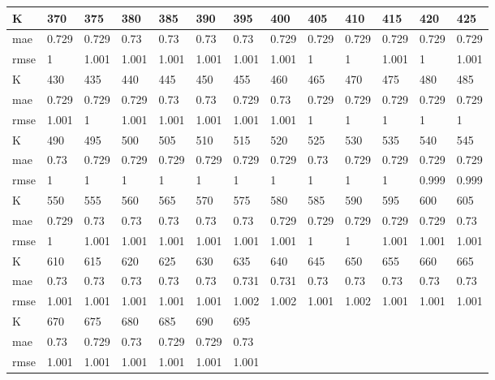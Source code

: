 \begin{appendices}
\begin{center}
\begin{tabularx}{\textwidth}{|l|X|X|X|X|X|X|X|X|X|X|X|X|}
		\hline 
		K & 370 & 375 & 380 & 385 & 390 & 395 & 400 & 405 & 410 & 415 & 420 & 425 \\ \hline 
		mae & 0.729 & 0.729 & 0.73 & 0.73 & 0.73 & 0.73 & 0.729 & 0.729 & 0.729 & 0.729 & 0.729 & 0.729 \\ \hline 
		rmse & 1 & 1.001 & 1.001 & 1.001 & 1.001 & 1.001 & 1.001 & 1 & 1 & 1.001 & 1 & 1.001 \\ \hline 
		\hline 
		K & 430 & 435 & 440 & 445 & 450 & 455 & 460 & 465 & 470 & 475 & 480 & 485 \\ \hline 
		mae & 0.729 & 0.729 & 0.729 & 0.73 & 0.73 & 0.729 & 0.73 & 0.729 & 0.729 & 0.729 & 0.729 & 0.729 \\ \hline 
		rmse & 1.001 & 1 & 1.001 & 1.001 & 1.001 & 1.001 & 1.001 & 1 & 1 & 1 & 1 & 1 \\ \hline 
		\hline 
		K & 490 & 495 & 500 & 505 & 510 & 515 & 520 & 525 & 530 & 535 & 540 & 545 \\ \hline 
		mae & 0.73 & 0.729 & 0.729 & 0.729 & 0.729 & 0.729 & 0.729 & 0.73 & 0.729 & 0.729 & 0.729 & 0.729 \\ \hline 
		rmse & 1 & 1 & 1 & 1 & 1 & 1 & 1 & 1 & 1 & 1 & 0.999 & 0.999 \\ \hline 
		\hline 
		K & 550 & 555 & 560 & 565 & 570 & 575 & 580 & 585 & 590 & 595 & 600 & 605 \\ \hline 
		mae & 0.729 & 0.73 & 0.73 & 0.73 & 0.73 & 0.73 & 0.729 & 0.729 & 0.729 & 0.729 & 0.729 & 0.73 \\ \hline 
		rmse & 1 & 1.001 & 1.001 & 1.001 & 1.001 & 1.001 & 1.001 & 1 & 1 & 1.001 & 1.001 & 1.001 \\ \hline 
		\hline 
		K & 610 & 615 & 620 & 625 & 630 & 635 & 640 & 645 & 650 & 655 & 660 & 665 \\ \hline 
		mae & 0.73 & 0.73 & 0.73 & 0.73 & 0.73 & 0.731 & 0.731 & 0.73 & 0.73 & 0.73 & 0.73 & 0.73 \\ \hline 
		rmse & 1.001 & 1.001 & 1.001 & 1.001 & 1.001 & 1.002 & 1.002 & 1.001 & 1.002 & 1.001 & 1.001 & 1.001 \\ \hline 
		\hline 
		K & 670 & 675 & 680 & 685 & 690 & 695  & & & & & & \\ \hline 
		mae & 0.73 & 0.729 & 0.73 & 0.729 & 0.729 & 0.73 & & & & & &  \\ \hline 
		rmse & 1.001 & 1.001 & 1.001 & 1.001 & 1.001 & 1.001  & & & & & & \\ \hline 
	\end{tabularx} 
\end{center}


\end{appendices}
